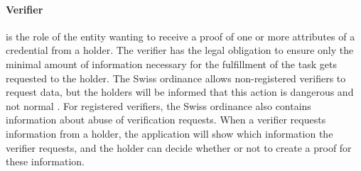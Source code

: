 \paragraph{Verifier} is the role of the entity wanting to receive a proof of one or more attributes of a credential from a holder.
The verifier has the legal obligation to ensure only the minimal amount of information necessary for the fulfillment of the task gets requested to the holder.
The Swiss ordinance allows non-registered verifiers to request data, but the holders will be informed that this action is dangerous and not normal \cite[Art. 14]{VEID25}.
For registered verifiers, the Swiss ordinance also contains information about abuse of verification requests.
When a verifier requests information from a holder, the application will show which information the verifier requests, and the holder can decide whether or not to create a proof for these information.
